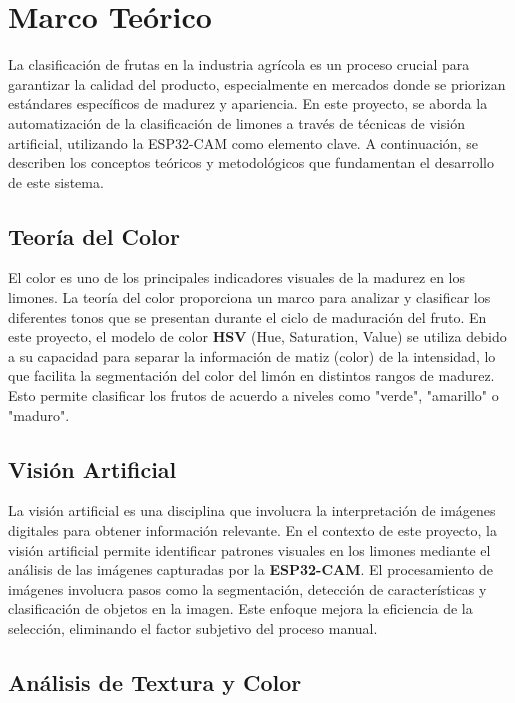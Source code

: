 \section{Marco Teórico}

La clasificación de frutas en la industria agrícola es un proceso crucial para garantizar la calidad del producto, especialmente en mercados donde se priorizan estándares específicos de madurez y apariencia. En este proyecto, se aborda la automatización de la clasificación de limones a través de técnicas de visión artificial, utilizando la ESP32-CAM como elemento clave. A continuación, se describen los conceptos teóricos y metodológicos que fundamentan el desarrollo de este sistema.

\subsection{Teoría del Color}

El color es uno de los principales indicadores visuales de la madurez en los limones. La teoría del color proporciona un marco para analizar y clasificar los diferentes tonos que se presentan durante el ciclo de maduración del fruto. En este proyecto, el modelo de color \textbf{HSV} (Hue, Saturation, Value) se utiliza debido a su capacidad para separar la información de matiz (color) de la intensidad, lo que facilita la segmentación del color del limón en distintos rangos de madurez. Esto permite clasificar los frutos de acuerdo a niveles como "verde", "amarillo" o "maduro".

\subsection{Visión Artificial}

La visión artificial es una disciplina que involucra la interpretación de imágenes digitales para obtener información relevante. En el contexto de este proyecto, la visión artificial permite identificar patrones visuales en los limones mediante el análisis de las imágenes capturadas por la \textbf{ESP32-CAM}. El procesamiento de imágenes involucra pasos como la segmentación, detección de características y clasificación de objetos en la imagen. Este enfoque mejora la eficiencia de la selección, eliminando el factor subjetivo del proceso manual.

\subsection{Análisis de Textura y Color}

